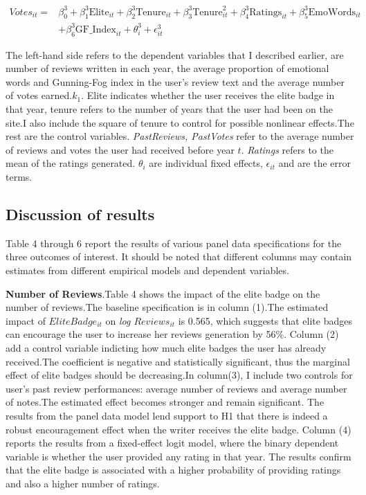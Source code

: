 \documentclass[12pt]{article}%
\begin{document}
\begin{equation}
\begin{split}
Votes_{it}=&\beta_0^3+\beta_1^3\text{Elite}_{it}+\beta_2^3\text{Tenure}_{it}+\beta_3^3\text{Tenure}_{it}^2+\beta_4^3\text{Ratings}_{it}+\beta_5^3\text{EmoWords}_{it}\\&+\beta_6^3\text{GF\_Index}_{it}+\theta_{i}^3+\epsilon_{it}^3
\end{split}
\end{equation}

The left-hand side refers to the dependent variables that I described earlier, are number of reviews written in each year, the average proportion of emotional words and Gunning-Fog index in the user's review text and the average number of votes earned.$k_{1}$. Elite indicates whether the user receives the elite badge in that year, tenure refers to the number of years that the user had been on the site.I also include the square of tenure to control for possible nonlinear effects.The rest are the control variables. \emph{PastReviews, PastVotes} refer to the average number of reviews and votes the user had  received before year $t$. \emph{Ratings} refers to the mean of the ratings generated. $\theta_{i}$ are individual fixed effects, $\epsilon_{it}$ and are the error terms.


\subsection{Discussion of results}
Table 4 through 6 report the results of various panel data specifications for the three outcomes of interest. It should be noted that different columns may contain estimates from different empirical models and dependent variables.

\textbf{Number of Reviews}.Table 4 shows the impact of the elite badge on the number of reviews.The baseline specification is in column (1).The estimated impact of \emph{$EliteBadge_{it}$} on \emph{log $Reviews_{it}$} is 0.565, which suggests that elite badges can encourage the user to increase her reviews generation by 56\%. Column (2) add a control variable indicting how much elite badges the user has already received.The coefficient is negative and statistically significant, thus the marginal effect of elite badges should be decreasing.In column(3), I include two controls for user's past review performances: average number of reviews and average number of notes.The estimated effect becomes stronger and remain significant. The results from the panel data model lend support to H1 that there is indeed a robust encouragement effect when the writer receives the elite badge. Column (4) reports the results from a fixed-effect logit model, where the binary dependent variable is whether the user provided any rating in that year. The results confirm that the elite badge is associated with a higher probability of providing ratings and also a higher number of ratings.
\end{document}
